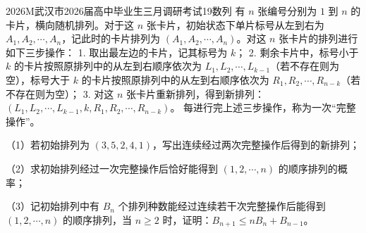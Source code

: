 
\begin{problem}{2026}{M}{武汉市2026届高中毕业生三月调研考试}{19}{数列}
有 $n$ 张编号分别为 $1$ 到 $n$ 的卡片，横向随机排列。对于这 $n$ 张卡片，初始状态下单片标号从左到右为 $A_1, A_2, \cdots, A_n$，记此时的卡片排列为 $(A_1, A_2, \cdots, A_n)$。对这 $n$ 张卡片的排列进行如下三步操作：  
1. 取出最左边的卡片，记其标号为 $k$；  
2. 剩余卡片中，标号小于 $k$ 的卡片按照原排列中的从左到右顺序依次为 $L_1, L_2, \cdots, L_{k-1}$（若不存在则为空），标号大于 $k$ 的卡片按照原排列中的从左到右顺序依次为 $R_1, R_2, \cdots, R_{n-k}$（若不存在则为空）；  
3. 对这 $n$ 张卡片重新排列，得到新排列：$(L_1, L_2, \cdots, L_{k-1}, k, R_1, R_2, \cdots, R_{n-k})$。  
每进行完上述三步操作，称为一次“完整操作”。

（1）若初始排列为 $(3,5,2,4,1)$，写出连续经过两次完整操作后得到的新排列；

（2）求初始排列经过一次完整操作后恰好能得到 $(1,2,\cdots,n)$ 的顺序排列的概率；

（3）记初始排列中有 $B_n$ 个排列种数能经过连续若干次完整操作后能得到 $(1,2,\cdots,n)$ 的顺序排列，当 $n\geq 2$ 时，证明：$B_{n+1}\leq nB_n + B_{n-1}$。
\end{problem}